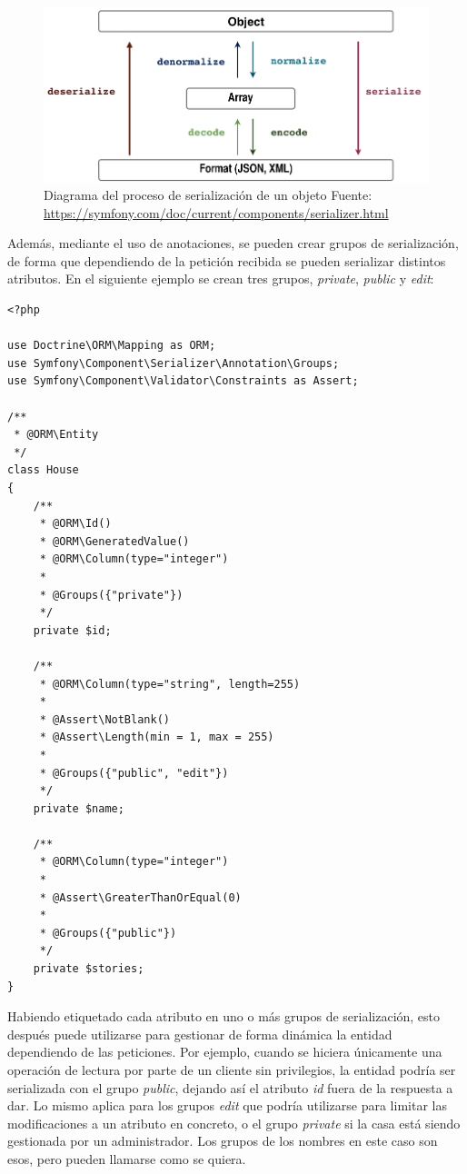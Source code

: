 \begin{figure}[h]
    \center
    \includegraphics[scale=0.3]{img/serializer_workflow}
    \caption{Diagrama del proceso de serialización de un objeto
      Fuente: \url{https://symfony.com/doc/current/components/serializer.html}}
\end{figure}

Además, mediante el uso de anotaciones, se pueden crear grupos de
serialización, de forma que dependiendo de la petición recibida se pueden
serializar distintos atributos. En el siguiente ejemplo se crean tres grupos,
\textit{private}, \textit{public} y \textit{edit}:

\begin{verbatim}
<?php

use Doctrine\ORM\Mapping as ORM;
use Symfony\Component\Serializer\Annotation\Groups;
use Symfony\Component\Validator\Constraints as Assert;

/**
 * @ORM\Entity
 */
class House
{
    /**
     * @ORM\Id()
     * @ORM\GeneratedValue()
     * @ORM\Column(type="integer")
     *
     * @Groups({"private"})
     */
    private $id;

    /**
     * @ORM\Column(type="string", length=255)
     *
     * @Assert\NotBlank()
     * @Assert\Length(min = 1, max = 255)
     *
     * @Groups({"public", "edit"})
     */
    private $name;

    /**
     * @ORM\Column(type="integer")
     *
     * @Assert\GreaterThanOrEqual(0)
     *
     * @Groups({"public"})
     */
    private $stories;
}
\end{verbatim}

Habiendo etiquetado cada atributo en uno o más grupos de serialización, esto
después puede utilizarse para gestionar de forma dinámica la entidad
dependiendo de las peticiones. Por ejemplo, cuando se hiciera únicamente una
operación de lectura por parte de un cliente sin privilegios, la entidad podría
ser serializada con el grupo \textit{public}, dejando así el atributo
\textit{id} fuera de la respuesta a dar. Lo mismo aplica para los grupos
\textit{edit} que podría utilizarse para limitar las modificaciones a un
atributo en concreto, o el grupo \textit{private} si la casa está siendo
gestionada por un administrador. Los grupos de los nombres en este caso son
esos, pero pueden llamarse como se quiera.

